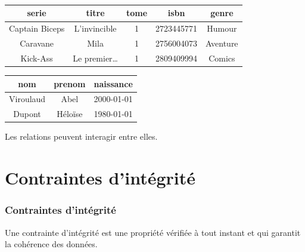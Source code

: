 \documentclass[svgnames,11pt]{beamer}
\begin{document}
\begin{frame}
    \frametitle{}

    \begin{center}
        \begin{tabular}{|*{5}{c|}}
            \hline
            serie          & titre           & tome & isbn       & genre    \\
            \hline
            Captain Biceps & L’invincible    & 1    & 2723445771 & Humour   \\
            Caravane       & Mila            & 1    & 2756004073 & Aventure \\
            Kick-Ass       & Le premier\dots & 1    & 2809409994 & Comics   \\
            \hline
        \end{tabular}
    \end{center}

    \begin{center}
        \begin{tabular}{|*{3}{c|}}
            \hline
            nom       & prenom  & naissance  \\
            \hline
            Viroulaud & Abel    & 2000-01-01 \\
            Dupont    & Héloïse & 1980-01-01 \\
            \hline
        \end{tabular}
    \end{center}
    \begin{aretenir}[Remarque]
        Les relations peuvent interagir entre elles.
    \end{aretenir}
\end{frame}
\section{Contraintes d'intégrité}
\begin{frame}
    \frametitle{Contraintes d'intégrité}

    \begin{aretenir}[]
        Une contrainte d’intégrité est une propriété vérifiée à tout instant et qui garantit la cohérence des
        données.
    \end{aretenir}

\end{frame}
\end{document}
